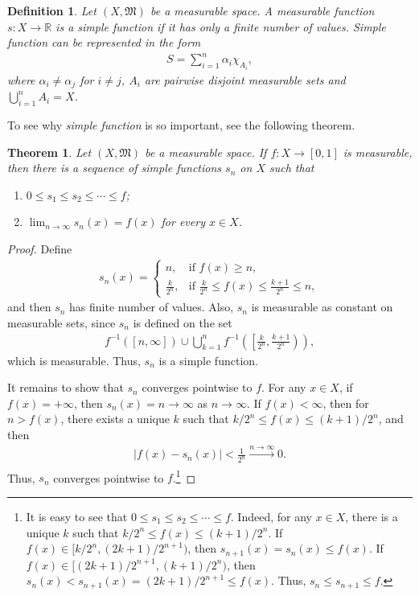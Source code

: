 \documentclass[11pt]{book}
\newtheorem{definition}{Definition}[chapter]
\newtheorem{theorem}{Theorem}[chapter]
\theoremstyle{definition}
\numberwithin{equation}{chapter}
\begin{document}
\begin{definition}
Let $(X,\mathfrak{M})$ be a measurable space. A measurable function $s: X \to \mathbb{R}$ is a simple function if it has only a finite number of values. Simple function can be represented in the form
\begin{align*}
    S = \sum^n_{i=1} \alpha_i \chi_{A_i},
\end{align*}
where $\alpha_i \neq \alpha_j$ for $i \neq j$, $A_i$ are pairwise disjoint measurable sets and $\bigcup^n_{i=1} A_i = X$.
\end{definition}

\medskip

To see why {\em simple function} is so important, see the following theorem.

\medskip

\begin{theorem}\label{theorem_27}
Let $(X,\mathfrak{M})$ be a measurable space. If $f: X \to [0,1]$ is measurable, then there is a sequence of simple functions $s_n$ on $X$ such that 
\begin{enumerate}[label=(\alph*)]
    \item $0 \leq s_1 \leq s_2 \leq \cdots \leq f$;
    
    \item $\lim_{n\to\infty} s_n(x) = f(x)$ for every $x \in X$.
\end{enumerate}
\end{theorem}
\begin{proof}
Define
\begin{align*}
    s_n(x) = \begin{cases}
        n, & \text{if}\,\, f(x) \geq n, \\
        \frac{k}{2^n}, & \text{if}\,\, \frac{k}{2^n} \leq f(x) \leq \frac{k+1}{2^n} \leq n,
    \end{cases}
\end{align*}
and then $s_n$ has finite number of values. Also, $s_n$ is measurable as constant on measurable sets, since $s_n$ is defined on the set
\begin{align*}
    f^{-1}([n,\infty]) \cup \bigcup^n_{k=1} f^{-1}\left(\left[\frac{k}{2^n},\frac{k+1}{2^n}\right)\right),
\end{align*}
which is measurable. Thus, $s_n$ is a simple function.

It remains to show that $s_n$ converges pointwise to $f$. For any $x \in X$, if $f(x) = +\infty$, then $s_n(x) = n \to \infty$ as $n \to \infty$. If $f(x) < \infty$, then for $n > f(x)$, there exists a unique $k$ such that $k/2^n \leq f(x) \leq (k+1)/2^n$, and then
\begin{align*}
    \left|f(x) - s_n(x)\right| < \frac{1}{2^n} \xrightarrow[]{n\to\infty} 0.
\end{align*}
Thus, $s_n$ converges pointwise to $f$.\footnote{It is easy to see that $0 \leq s_1 \leq s_2 \leq \cdots \leq f$. Indeed, for any $x \in X$, there is a unique $k$ such that $k/2^n \leq f(x) \leq (k+1)/2^n$. If $f(x)\in [k/2^n,(2k+1)/2^{n+1})$, then $s_{n+1}(x) = s_n(x) \leq f(x)$. If $f(x)\in [(2k+1)/2^{n+1},(k+1)/2^n)$, then $s_n(x) < s_{n+1}(x) = (2k+1)/2^{n+1} \leq f(x)$. Thus, $s_n \leq s_{n+1} \leq f$.}
\end{proof}
\end{document}
